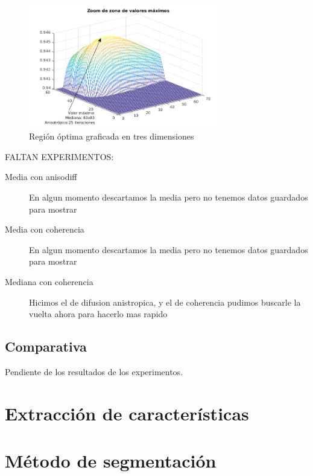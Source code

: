 \begin{figure}[H]
	\centering
  \includegraphics[width=0.75\textwidth]{./Figures/FiguraEvaluacionMaximosAnisodiff.png}
  \caption{Regi\'on \'optima graficada en tres dimensiones}
  \label{fig:centeredregionthermal}
\end{figure}


FALTAN EXPERIMENTOS:
\begin{description}
  \item[Media con anisodiff] En algun momento descartamos la media pero no tenemos datos guardados para mostrar
  \item[Media con coherencia] En algun momento descartamos la media pero no tenemos datos guardados para mostrar
  \item[Mediana con coherencia] Hicimos el de difusion anistropica, y el de coherencia pudimos buscarle la vuelta ahora para hacerlo mas rapido
\end{description}

\subsection{Comparativa}

Pendiente de los resultados de los experimentos.

\section{Extracci\'on de caracter\'isticas}

\section{M\'etodo de segmentaci\'on}
